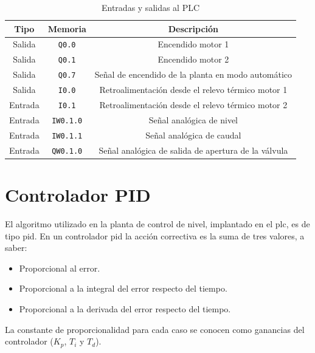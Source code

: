 \begin{table}[!t]

\renewcommand{\arraystretch}{1.3}
\centering
\begin{tabular}{c||c||c}
\hline
\bfseries Tipo & \bfseries Memoria & \bfseries Descripción\\
\hline \hline
Salida & \verb|Q0.0|  & Encendido motor 1\\
Salida & \verb|Q0.1|  & Encendido motor 2\\
Salida & \verb|Q0.7|  & Señal de encendido de la planta en modo automático\\
Salida & \verb|I0.0|  & Retroalimentación desde el relevo térmico motor 1\\
\hline
Entrada & \verb|I0.1|  & Retroalimentación desde el relevo térmico motor 2\\
Entrada & \verb|IW0.1.0|  & Señal analógica de nivel\\
Entrada & \verb|IW0.1.1|  & Señal analógica de caudal \\
Entrada & \verb|QW0.1.0|  & Señal analógica de salida de apertura de la válvula
\\
\hline
\end{tabular}
\caption{Entradas y salidas al PLC}
\label{table:entradassalidas}
\end{table}

\section{Controlador PID}
\label{sec:controladorpid}

El algoritmo utilizado en la planta de control de nivel, implantado en el
\gls{plc}, es de tipo \gls{pid}.
En un controlador \gls{pid} la acción correctiva es la suma de tres valores, a
saber:

\begin{itemize}
 \item Proporcional al error.
 \item Proporcional a la integral del error respecto del tiempo.
 \item Proporcional a la derivada del error respecto del tiempo.
\end{itemize}
La constante de proporcionalidad para cada caso se conocen como ganancias del
controlador ($K_p$, $T_i$ y $T_d$).

